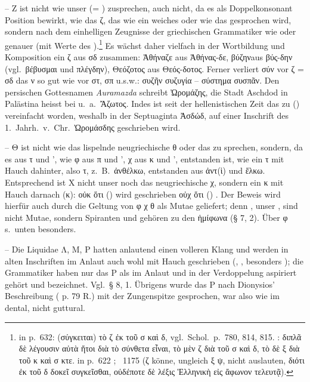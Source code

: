 \noindent -- Z ist nicht wie unser  (= )
zusprechen, auch nicht, da es als Doppelkonsonant Position bewirkt, wie
das  ζ, das wie ein weiches  oder wie das
 
gesprochen wird, sondern nach dem einhelligen Zeugnisse der griechischen
Grammatiker wie  oder genauer  (mit  Werte des
).\footnote{%
	 in  p.\ 632: (σύγκειται) τὸ ζ ἐκ τοῦ σ καὶ δ,
	vgl.\ Schol.\ p.\ 780, 814, 815.
	: διπλᾶ δὲ λέγουσιν αὐτὰ ἤτοι διὰ τὸ
	σύνθετα εἶναι, τὸ μὲν ζ διὰ τοῦ σ καὶ δ, τὸ δὲ ξ διὰ τοῦ κ καὶ σ κτε.
	 in  p.\ 622 ; \ 1175 (ζ könne, ungleich
	ξ ψ, nicht auslauten, διότι ἐκ τοῦ δ δοκεῖ συγκεῖσθαι, οὐδέποτε δὲ λέξις
	Ἑλληνικὴ εἰς ἄφωνον τελευτᾷ).
}
Es wächst daher vielfach in der Wortbildung und Komposition ein ζ aus σδ
zusammen: Ἀθήναζε aus Ἀθήνας-δε, βύζηνaus βύς-δην (vgl.\ βέβυσμαι und πλέγδην), Θεόζοτος aus Θεός-δοτος.
Ferner verliert σύν vor ζ = σδ das ν so gut wie vor στ, σπ u.s.w.:
συζῆν συζυγία -- σύστημα συσπᾶν.
Den persischen Gottesnamen \emph{Auramazda} schreibt
 Ὠρομάζης, die Stadt Aschdod in Palästina heisst bei
 u.~a.~Ἄζωτος.
Indes ist seit der hellenistischen Zeit das  zu  () vereinfacht worden,
weshalb in der Septuaginta Ἀσδώδ, auf einer Inschrift des 1.\ Jahrh.~v.~Chr.\
Ὠρομάσδης geschrieben wird.

\noindent -- Θ ist nicht wie das lispelnde neugriechische θ oder
das \langlongdecl{engl}{e} \ipa{th} zu sprechen, sondern, da es aus τ und ', wie
φ aus π und ', χ aus κ und ', entstanden ist, wie ein τ mit Hauch dahinter, also
τ, z.~B.\ ἀνθέλκω, entstanden aus ἀντ{(ὶ)} und ἕλκω.
Entsprechend ist X nicht unser  noch das neugriechische χ, sondern ein κ
mit Hauch darnach (κ): οὐκ ὅτι () wird geschrieben οὐχ ὅτι
(\epigraphic{ΟΥΧΟΤΙ}) \ipa{oukhoti}.
Der Beweis wird hierfür auch durch die Geltung von φ χ θ als Mutae geliefert;
denn \langlongdecl{engl}{es} \ipa{th}, unser \ipa{ch}, \ipa{f} sind nicht Mutae,
sondern Spiranten und gehören zu den ἡμίφωνα (§ 7, 2). %
Über φ s.\ unten besonders.

\noindent -- Die Liquidae Λ, Μ, Ρ hatten anlautend einen volleren
Klang und werden in alten Inschriften im Anlaut auch wohl mit Hauch geschrieben
(\epigraphic{ΛΗ}, \epigraphic{ΡΗ}, besonders \epigraphic{ΜΗ}); die Grammatiker
haben nur das P als im Anlaut und in der Verdoppelung aspiriert gehört und
bezeichnet.
Vgl.\ § 8, 1. %
Übrigens wurde das P nach Dionysios' Beschreibung ( p. 79 R.) mit der
Zungenspitze gesprochen, war also wie im \Langlongdecl{neugrc}{en} dental, nicht guttural.

